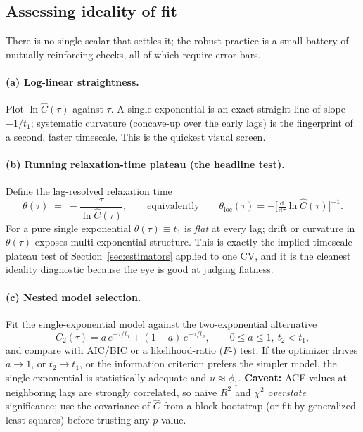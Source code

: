 \documentclass[11pt]{article}
\theoremstyle{plain}
\theoremstyle{definition}
\begin{document}
\subsection{Assessing ideality of fit}

There is no single scalar that settles it; the robust practice is a small battery of
mutually reinforcing checks, all of which require error bars.

\paragraph{(a) Log-linear straightness.} Plot $\ln\widehat C(\tau)$ against $\tau$.
A single exponential is an exact straight line of slope $-1/t_1$; systematic
curvature (concave-up over the early lags) is the fingerprint of a second, faster
timescale. This is the quickest visual screen.

\paragraph{(b) Running relaxation-time plateau (the headline test).} Define the
lag-resolved relaxation time
\begin{equation}
\theta(\tau)\;=\;-\frac{\tau}{\ln\widehat C(\tau)} ,
\qquad\text{equivalently}\qquad
\theta_{\mathrm{loc}}(\tau)=-\Big[\tfrac{\mathrm d}{\mathrm d\tau}\ln\widehat C(\tau)\Big]^{-1}.
\end{equation}
For a pure single exponential $\theta(\tau)\equiv t_1$ is \emph{flat} at every lag;
drift or curvature in $\theta(\tau)$ exposes multi-exponential structure. This is
exactly the implied-timescale plateau test of Section~\ref{sec:estimators} applied to
one CV, and it is the cleanest ideality diagnostic because the eye is good at judging
flatness.

\paragraph{(c) Nested model selection.} Fit the single-exponential model against the
two-exponential alternative
\begin{equation}
C_2(\tau)=a\,e^{-\tau/t_1}+(1-a)\,e^{-\tau/t_2},\qquad 0\le a\le1,\ t_2<t_1,
\end{equation}
and compare with AIC/BIC or a likelihood-ratio ($F$-) test. If the optimizer drives
$a\to1$, or $t_2\to t_1$, or the information criterion prefers the simpler model, the
single exponential is statistically adequate and $u\approx\phi_1$. \textbf{Caveat:}
ACF values at neighboring lags are strongly correlated, so naive $R^2$ and
$\chi^2$ \emph{overstate} significance; use the covariance of $\widehat C$ from a
block bootstrap (or fit by generalized least squares) before trusting any $p$-value.
\end{document}
